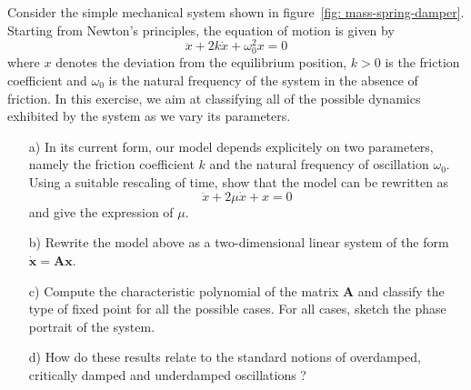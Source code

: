 \begin{problem}
  Consider the simple mechanical system shown in figure~\ref{fig: mass-spring-damper}.
  Starting from Newton's principles, the equation of motion is given by
  \[
  \ddot{x} + 2k \dot{x} + \omega_0^2 x = 0
  \]
  where $x$ denotes the deviation from the equilibrium position, $k > 0$ is the friction coefficient and $\omega_0$ is the natural frequency of the system in the absence of friction.
  In this exercise, we aim at classifying all of the possible dynamics exhibited by the system as we vary its parameters.
  
  \bigskip
  
  \begin{enumerate}
  \item[a)] In its current form, our model depends explicitely on two parameters, namely the friction coefficient $k$ and the natural frequency of oscillation $\omega_0$.
    Using a suitable rescaling of time, show that the model can be rewritten as
    \[
    \ddot{x} + 2 \mu \dot{x} + x = 0
    \]
    and give the expression of $\mu$.
    
  \item[b)] Rewrite the model above as a two-dimensional linear system of the form $\dot{\bm{x}} = \bm{Ax}$.
    
  \item[c)] Compute the characteristic polynomial of the matrix $\bm{A}$ and classify the type of fixed point for all the possible cases.
    For all cases, sketch the phase portrait of the system.
    
  \item[d)] How do these results relate to the standard notions of overdamped, critically damped and underdamped oscillations ?
  \end{enumerate}
  
\end{problem}

